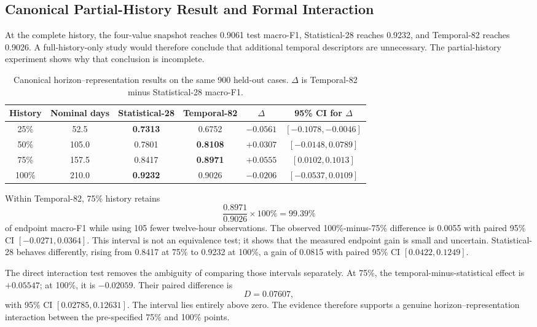 \documentclass[conference]{IEEEtran}
\begin{document}
\subsection{Canonical Partial-History Result and Formal Interaction}
At the complete history, the four-value snapshot reaches 0.9061 test macro-F1, Statistical-28 reaches 0.9232, and Temporal-82 reaches 0.9026. A full-history-only study would therefore conclude that additional temporal descriptors are unnecessary. The partial-history experiment shows why that conclusion is incomplete.

\begin{table}[t]
\caption{Canonical horizon--representation results on the same 900 held-out cases. $\Delta$ is Temporal-82 minus Statistical-28 macro-F1.}
\label{tab:horizon}
\centering
\footnotesize
\begin{tabular}{cccccc}
\toprule
History & Nominal days & Statistical-28 & Temporal-82 & $\Delta$ & 95\% CI for $\Delta$ \\
\midrule
25\% & 52.5 & \textbf{0.7313} & 0.6752 & $-0.0561$ & $[-0.1078,-0.0046]$ \\
50\% & 105.0 & 0.7801 & \textbf{0.8108} & $+0.0307$ & $[-0.0148,0.0789]$ \\
75\% & 157.5 & 0.8417 & \textbf{0.8971} & $\mathbf{+0.0555}$ & $\mathbf{[0.0102,0.1013]}$ \\
100\% & 210.0 & \textbf{0.9232} & 0.9026 & $-0.0206$ & $[-0.0537,0.0109]$ \\
\bottomrule
\end{tabular}
\end{table}

Within Temporal-82, 75\% history retains
\begin{equation}
\frac{0.8971}{0.9026}\times100\%=99.39\%
\end{equation}
of endpoint macro-F1 while using 105 fewer twelve-hour observations. The observed 100\%-minus-75\% difference is 0.0055 with paired 95\% CI $[-0.0271,0.0364]$. This interval is not an equivalence test; it shows that the measured endpoint gain is small and uncertain. Statistical-28 behaves differently, rising from 0.8417 at 75\% to 0.9232 at 100\%, a gain of 0.0815 with paired 95\% CI $[0.0422,0.1249]$.

The direct interaction test removes the ambiguity of comparing those intervals separately. At 75\%, the temporal-minus-statistical effect is $+0.05547$; at 100\%, it is $-0.02059$. Their paired difference is
\begin{equation}
D=0.07607,
\end{equation}
with 95\% CI $[0.02785,0.12631]$. The interval lies entirely above zero. The evidence therefore supports a genuine horizon--representation interaction between the pre-specified 75\% and 100\% points.
\end{document}
